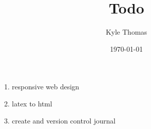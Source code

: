 \documentclass{revtex4-1}
\title{Todo}
\author{Kyle Thomas}
\date{\today}
\begin{document}
\begin{enumerate}
\item responsive web design
\item latex to html
\item create and version control journal
\end{enumerate}
\end{document}
